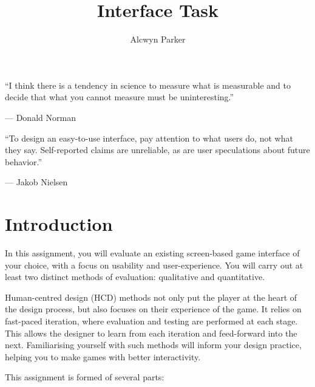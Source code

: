 \documentclass{../../fal_assignment}
\title{Interface Task}
\author{Alcwyn Parker}
\begin{document}
\maketitle

\begin{marginquote}
    ``I think there is a tendency in science to measure what is measurable and to decide that what you cannot measure must be uninteresting.''
    
    --- Donald Norman
    
    \marginquoterule
    
    ``To design an easy-to-use interface, pay attention to what users do, not what they say. Self-reported claims are unreliable, as are user speculations about future behavior.''
    
    --- Jakob Nielsen
\end{marginquote}

\section*{Introduction}

In this assignment, you will evaluate an existing screen-based game interface of your choice, with a focus on usability and user-experience. You will carry out at least two distinct methods of evaluation: qualitative and quantitative.

Human-centred design (HCD) methods not only put the player at the heart of the design process, but also focuses on their experience of the game. It relies on fast-paced iteration, where evaluation and testing are performed at each stage. This allows the designer to learn from each iteration and feed-forward into the next. Familiarising yourself with such methods will inform your design practice, helping you to make games with better interactivity.  

This assignment is formed of several parts:
\end{document}
